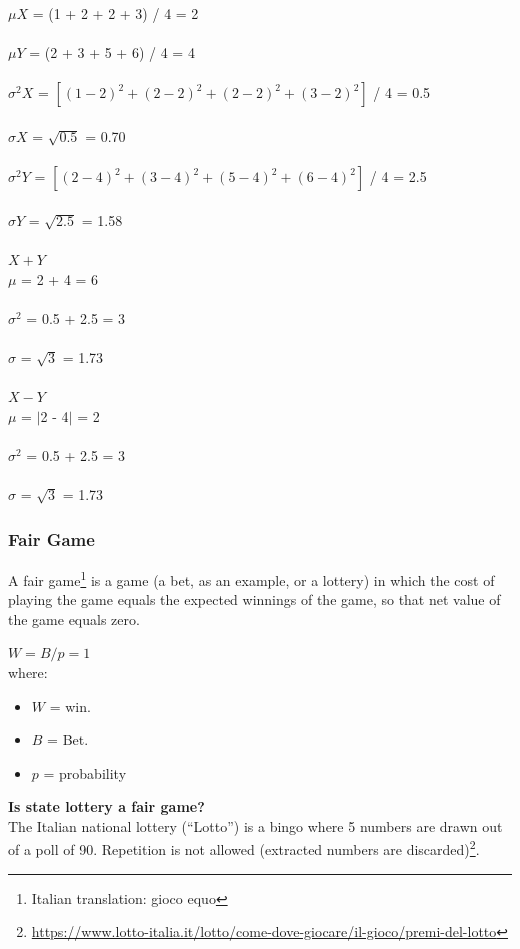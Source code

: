 \documentclass{article}
\begin{document}
$\mu X$ = (1 + 2 + 2 + 3) / 4 = 2 \\
\mbox{} \\
$\mu Y$ = (2 + 3 + 5 + 6) / 4 = 4 \\ 
\mbox{} \\
$\sigma^2 X$ = $[(1 - 2)^2 + (2 - 2)^2 + (2 - 2)^2 + (3 - 2)^2 ]$ / 4 = 0.5  \\
\mbox{} \\
$\sigma X$ =  $\sqrt{0.5}$ = 0.70 \\ 
\mbox{} \\
$\sigma^2 Y$ = $[(2 - 4)^2 + (3 - 4)^2 + (5 - 4)^2 + (6 - 4)^2]$ / 4 = 2.5  \\
\mbox{} \\
$\sigma Y$ =  $\sqrt{2.5}$ = 1.58 \\
\mbox{} \\
$X + Y$ \\
$\mu$ = 2 + 4 = 6 \\
\mbox{} \\
$\sigma^2$ = 0.5 + 2.5 = 3 \\ 
\mbox{} \\
$\sigma$ = $\sqrt{3}$ = 1.73 \\ 
\mbox{} \\
$X - Y$ \\ 
$\mu$ = $|$2 - 4$|$ = 2 \\ 
\mbox{} \\
$\sigma^2$ = 0.5 + 2.5 = 3 \\ 
\mbox{} \\
$\sigma$ = $\sqrt{3}$ = 1.73 \\

\subsubsection{Fair Game}
A fair game\footnote{Italian translation: gioco equo} is a game (a bet, as an example, or a lottery) in which the cost of playing the game equals the expected winnings of the game, so that net value of the game equals zero.

$W = B/p = 1$ 
\mbox{} \\
where:
\begin{itemize}
    \item $W$ = win.
    \item $B$ = Bet.
    \item $p$ = probability
\end{itemize}




\textbf{Is state lottery a fair game?}\\ 
The Italian national lottery (“Lotto”) is a bingo where 5 numbers are drawn out of a poll of 90. Repetition is not allowed (extracted numbers are discarded)\footnote{\url{https://www.lotto-italia.it/lotto/come-dove-giocare/il-gioco/premi-del-lotto}}. 
\end{document}
